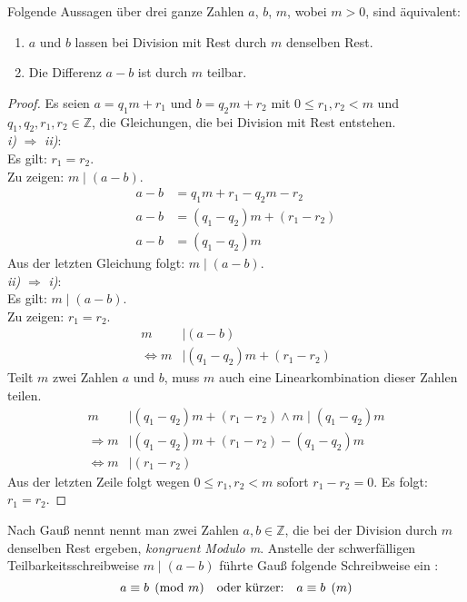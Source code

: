 \begin{lemma}
  Folgende Aussagen über drei ganze Zahlen $a$, $b$, $m$, wobei $m > 0$, sind äquivalent:
  \begin{enumerate}[label=\roman*)]
    \item $a$ und $b$ lassen bei Division mit Rest durch $m$ denselben Rest.
    \item Die Differenz $a - b$ ist durch $m$ teilbar.
  \end{enumerate}
\end{lemma}
\begin{proof}
  Es seien $a = q_1m + r_1$ und $b = q_2m + r_2$ mit $0 \leq r_1,r_2 < m$
  und  $q_1,q_2,r_1,r_2 \in \mathbb{Z}$, die Gleichungen,
  die bei Division mit Rest entstehen. \\
  \textit{i)} $\Rightarrow$ \textit{ii)}: \\
  Es gilt: $r_1 = r_2$. \\
  Zu zeigen: $m \mid (a-b)$.
  \begin{align*}
    a - b & = q_1m + r_1 - q_2m - r_2    \\
    a - b & = (q_1 - q_2)m + (r_1 - r_2) \\
    a - b & = (q_1 - q_2)m
  \end{align*}
  Aus der letzten Gleichung folgt: $m \mid (a - b)$. \\
  \textit{ii)} $\Rightarrow$ \textit{i)}: \\
  Es gilt: $m \mid (a - b)$. \\
  Zu zeigen: $r_1 = r_2$.
  \begin{align*}
    m                 & \mid (a - b)                    \\
    \Leftrightarrow m & \mid (q_1 - q_2)m + (r_1 - r_2)
  \end{align*}
  Teilt $m$ zwei Zahlen $a$ und $b$, muss $m$ auch eine Linearkombination dieser Zahlen teilen.
  \begin{align*}
    m                 & \mid (q_1 - q_2)m + (r_1 - r_2) \wedge m \mid (q_1 - q_2)m \\
    \Rightarrow m     & \mid (q_1 - q_2)m + (r_1 - r_2) - (q_1 - q_2)m             \\
    \Leftrightarrow m & \mid (r_1 - r_2)
  \end{align*}
  Aus der letzten Zeile folgt wegen $0 \leq r_1,r_2 < m$ sofort $r_1 - r_2 = 0$.
  Es folgt: $r_1 = r_2$.
\end{proof}

\noindent
Nach Gauß nennt nennt man zwei Zahlen $a, b \in \mathbb{Z}$, die bei der Division durch $m$
denselben Rest ergeben, \textit{kongruent Modulo m}. Anstelle der schwerfälligen
Teilbarkeitsschreibweise $m \mid (a - b)$
führte Gauß folgende Schreibweise ein \parencite[180]{BOOK:numberTheory}:
\begin{equation}
  \label{eq:kongruenz}
  a \equiv b \pmod{m} \text{\quad oder kürzer:\quad} a \equiv b \pod{m}
\end{equation}

